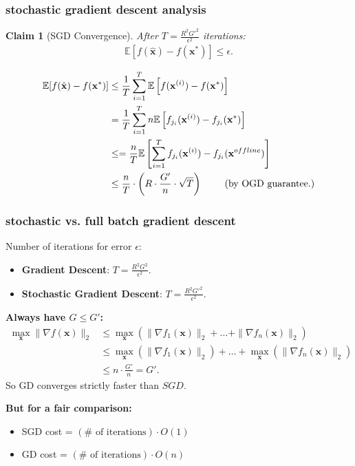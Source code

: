 \documentclass[compress]{beamer}
\newcommand{\bv}[1]{\mathbf{#1}}
\newcommand{\E}{\mathbb{E}}
\newtheorem{claim}[theorem]{Claim}
\begin{document}
\begin{frame}[t]
	\frametitle{stochastic gradient descent analysis}
	\small
	\begin{claim}[SGD Convergence]
		After $T = \frac{R^2G'^2}{\epsilon^2}$ iterations:
		\vspace{-1em}
		\begin{align*}
			\E\left[f(\hat{\bv{x}}) - f(\bv{x}^*)\right] \leq \epsilon.
		\end{align*}
		
		\vspace{-1em}
	\end{claim}\vspace{-2em}
	\begin{align*}
		\E[f(\hat{\bv{x}}) - f(\bv{x}^*)] &\leq \frac{1}{T}\sum_{i=1}^T\E\left[f(\bv{x}^{(i)}) -f(\bv{x}^*)\right]
		\\
		&=\frac{1}{T}\sum_{i=1}^Tn\E\left[f_{j_i}(\bv{x}^{(i)}) -f_{j_i}(\bv{x}^*)\right]\\
		&\leq=\frac{n}{T}\E\left[\sum_{i=1}^T f_{j_i}(\bv{x}^{(i)}) -f_{j_i}(\bv{x}^{offline})\right]\\
		& \leq \frac{n}{T} \cdot\left(R\cdot\frac{G'}{n}\cdot \sqrt{T}\right) \text{\hspace{2em} (by OGD guarantee.)}
	\end{align*}
\end{frame}


\begin{frame}[t]
	\frametitle{stochastic vs. full batch gradient descent}
	Number of iterations for error $\epsilon$:
	\begin{itemize}
		\item \textbf{Gradient Descent}: $T = \frac{R^2 G^2}{\epsilon^2}$. 
		\item \textbf{Stochastic Gradient Descent}: $T = \frac{R^2 G'^2}{\epsilon^2}$. 
	\end{itemize}
	
	\textbf{Always have $G \leq G'$:}
	\begin{align*}
		\max_{\bv{x}} \|\nabla f(\bv{x})\|_2 &\leq\max_{\bv{x}}\left( \|\nabla f_1(\bv{x})\|_2 + \ldots + \|\nabla f_n(\bv{x})\|_2\right) \\
		&\leq \max_{\bv{x}}\left( \|\nabla f_1(\bv{x})\|_2\right)+ \ldots + \max_{\bv{x}}\left( \|\nabla f_n(\bv{x})\|_2\right) \\
		&\leq n\cdot\frac{G'}{n} = G'.
	\end{align*}
So GD converges strictly faster than $SGD$. 
	
	\textbf{But for a fair comparison:}
	\begin{itemize}
		\item SGD cost = $(\# \text{ of iterations})\cdot O(1)$
		\item GD cost = $(\# \text{ of iterations})\cdot O(n)$
	\end{itemize}
\end{frame}
\end{document}
